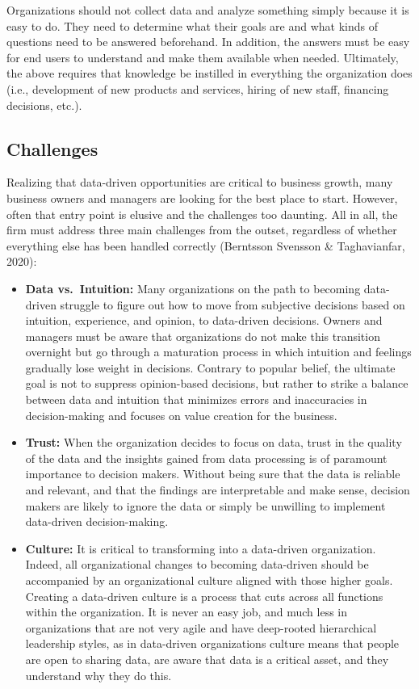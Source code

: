 \documentclass[
  letterpaper,
  DIV=11,
  numbers=noendperiod]{scrreprt}
\begin{document}
Organizations should not collect data and analyze something simply
because it is easy to do. They need to determine what their goals are
and what kinds of questions need to be answered beforehand. In addition,
the answers must be easy for end users to understand and make them
available when needed. Ultimately, the above requires that knowledge be
instilled in everything the organization does (i.e., development of new
products and services, hiring of new staff, financing decisions, etc.).

\hypertarget{challenges}{%
\subsection{Challenges}\label{challenges}}

Realizing that data-driven opportunities are critical to business
growth, many business owners and managers are looking for the best place
to start. However, often that entry point is elusive and the challenges
too daunting. All in all, the firm must address three main challenges
from the outset, regardless of whether everything else has been handled
correctly (Berntsson Svensson \& Taghavianfar, 2020):

\begin{itemize}
\item
  \textbf{Data vs.~Intuition:} Many organizations on the path to
  becoming data-driven struggle to figure out how to move from
  subjective decisions based on intuition, experience, and opinion, to
  data-driven decisions. Owners and managers must be aware that
  organizations do not make this transition overnight but go through a
  maturation process in which intuition and feelings gradually lose
  weight in decisions. Contrary to popular belief, the ultimate goal is
  not to suppress opinion-based decisions, but rather to strike a
  balance between data and intuition that minimizes errors and
  inaccuracies in decision-making and focuses on value creation for the
  business.
\item
  \textbf{Trust:} When the organization decides to focus on data, trust
  in the quality of the data and the insights gained from data
  processing is of paramount importance to decision makers. Without
  being sure that the data is reliable and relevant, and that the
  findings are interpretable and make sense, decision makers are likely
  to ignore the data or simply be unwilling to implement data-driven
  decision-making.
\item
  \textbf{Culture:} It is critical to transforming into a data-driven
  organization. Indeed, all organizational changes to becoming
  data-driven should be accompanied by an organizational culture aligned
  with those higher goals. Creating a data-driven culture is a process
  that cuts across all functions within the organization. It is never an
  easy job, and much less in organizations that are not very agile and
  have deep-rooted hierarchical leadership styles, as in data-driven
  organizations culture means that people are open to sharing data, are
  aware that data is a critical asset, and they understand why they do
  this.
\end{itemize}
\end{document}
